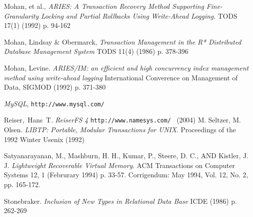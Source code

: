 \documentclass[letterpaper,twocolumn,english]{article}
\begin{document}
\begin{thebibliography}{99}
 Mohan, et al., {\em ARIES: A Transaction Recovery Method Supporting Fine-Granularity Locking and Partial Rollbacks Using Write-Ahead Logging.} TODS 17(1) (1992) p. 94-162

 Mohan, Lindsay \& Obermarck, {\em Transaction Management in the R* Distributed Database Management System} TODS 11(4) (1986) p. 378-396

 Mohan, Levine. {\em ARIES/IM: an efficient and high concurrency index management method using write-ahead logging} International Converence on Management of Data, SIGMOD (1992) p. 371-380

 {\em MySQL}, {\tt http://www.mysql.com/ }

 Reiser,~Hans~T. {\em ReiserFS 4} {\tt http://www.namesys.com/ } (2004)
%
 M. Seltzer, M. Olsen. {\em LIBTP: Portable, Modular Transactions for UNIX}. Proceedings of the 1992 Winter Usenix (1992)

 Satyanarayanan, M., Mashburn, H. H., Kumar, P., Steere, D. C., AND Kistler, J. J. {\em Lightweight Recoverable Virtual Memory}. ACM Transactions on Computer Systems 12, 1 (Februrary 1994) p. 33-57. Corrigendum: May 1994, Vol. 12, No. 2, pp. 165-172.

 Stonebraker. {\em Inclusion of New Types in Relational Data Base } ICDE (1986) p. 262-269

%
%


%
%
%
%
%
%
%

\end{thebibliography}
\end{document}
